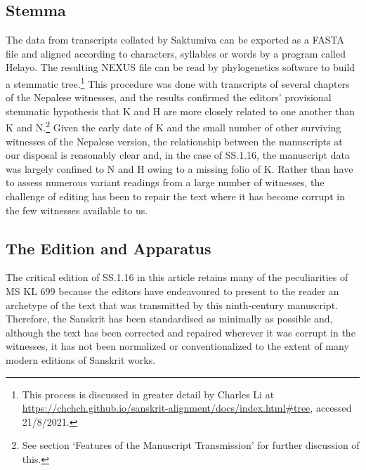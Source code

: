 \subsection{Stemma}
The data from transcripts collated by Saktumiva can be exported as a FASTA file 
and aligned according to characters, syllables or words by a program called 
Helayo. The resulting NEXUS file can be read by phylogenetics software to build a 
stemmatic tree.\footnote{This process is discussed in greater detail by Charles Li 
at \url{https://chchch.github.io/sanskrit-alignment/docs/index.html\#tree}, 
accessed 21/8/2021.} This procedure was done with transcripts of several 
chapters of the Nepalese witnesses, and the results confirmed the editors' 
provisional stemmatic hypothesis that 
K and H are more closely related to one another than K and N.\footnote{See 
section `Features of the Manuscript Transmission' for further discussion of this.} 
Given the early date of K and the small number of other surviving witnesses of the 
Nepalese version, the relationship between the manuscripts at our disposal is 
reasonably clear and, in the case of SS.1.16, the manuscript data was largely 
confined to N and H owing to a missing folio of K. Rather than have to assess 
numerous variant readings from a large number of witnesses, the challenge of 
editing has 
been to repair the text where it has become corrupt in the few witnesses available 
to us. 

\subsection{The Edition and Apparatus}

The critical edition of SS.1.16 in this article retains many of the peculiarities of MS 
KL 699 because the editors have endeavoured to present to the reader an 
archetype of the text that was transmitted by this ninth-century manuscript. 
Therefore, the Sanskrit has been standardised as minimally as possible and, 
although the text has been corrected and repaired wherever it was corrupt in the 
witnesses, it has not been normalized or conventionalized to the extent of many 
modern editions of Sanskrit works. 

